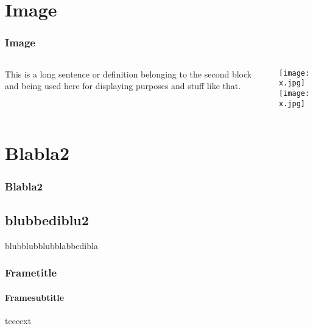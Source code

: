 \documentclass{beamer}
\begin{document}
	\section{Image}
	\begin{frame}
		\frametitle{Image}
		\begin{columns}
			\begin{column}{0.5\textwidth}
				\begin{block}{}
					This is a long sentence or definition belonging to the second block and being used here for displaying purposes and stuff like that.
				\end{block}
			\end{column}
			\begin{column}{0.5\textwidth}
				\texttt{[image: x.jpg]}\\
				\texttt{[image: x.jpg]}
			\end{column}
		\end{columns}
	\end{frame}
	\section{Blabla2}
	\begin{frame}
		\frametitle{Blabla2}
		\subsection{blubbediblu2}
		blubblubblubblabbedibla
	\end{frame}
	\begin{frame}
		\frametitle{Frametitle}
		\framesubtitle{Framesubtitle}
		teeeext
	\end{frame}
\end{document}
